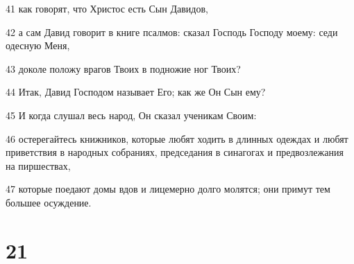 \par 41 как говорят, что Христос есть Сын Давидов,
\par 42 а сам Давид говорит в книге псалмов: сказал Господь Господу моему: седи одесную Меня,
\par 43 доколе положу врагов Твоих в подножие ног Твоих?
\par 44 Итак, Давид Господом называет Его; как же Он Сын ему?
\par 45 И когда слушал весь народ, Он сказал ученикам Своим:
\par 46 остерегайтесь книжников, которые любят ходить в длинных одеждах и любят приветствия в народных собраниях, председания в синагогах и предвозлежания на пиршествах,
\par 47 которые поедают домы вдов и лицемерно долго молятся; они примут тем большее осуждение.

\chapter{21}

